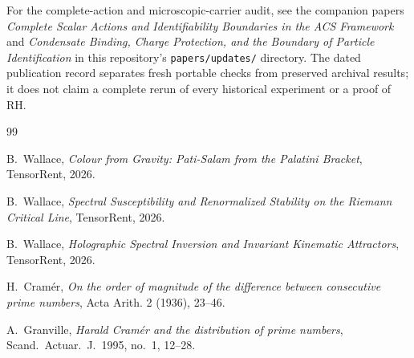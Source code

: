\documentclass[11pt,a4paper]{article}
\begin{document}
For the complete-action and microscopic-carrier audit, see the companion
papers \emph{Complete Scalar Actions and Identifiability Boundaries in the ACS
Framework} and \emph{Condensate Binding, Charge Protection, and the Boundary
of Particle Identification} in this repository's \texttt{papers/updates/}
directory. The dated publication record separates fresh portable checks
from preserved archival results; it does not claim a complete rerun of every
historical experiment or a proof of RH.

\begin{thebibliography}{99}

B.~Wallace,
\emph{Colour from Gravity: Pati-Salam from the Palatini Bracket},
TensorRent, 2026.

B.~Wallace,
\emph{Spectral Susceptibility and Renormalized Stability on the Riemann Critical Line},
TensorRent, 2026.

B.~Wallace,
\emph{Holographic Spectral Inversion and Invariant Kinematic Attractors},
TensorRent, 2026.

H.~Cram\'{e}r,
\emph{On the order of magnitude of the difference between consecutive prime numbers},
Acta Arith. 2 (1936), 23--46.

A.~Granville,
\emph{Harald Cram\'{e}r and the distribution of prime numbers},
Scand.\ Actuar.\ J.\ 1995, no.~1, 12--28.

\end{thebibliography}
\end{document}

